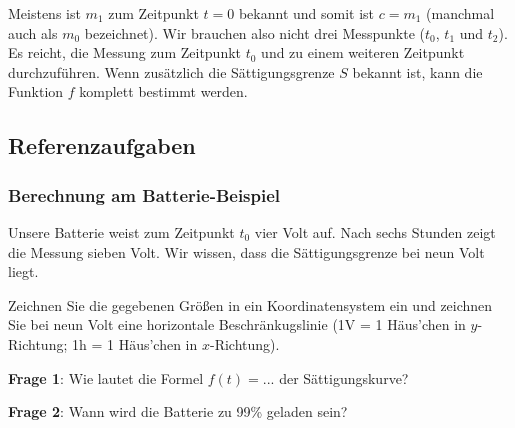 \begin{bemerkung}{}{}
Meistens ist $m_1$ zum Zeitpunkt $t=0$ bekannt und somit ist $c=m_1$ (manchmal auch als $m_0$ bezeichnet). Wir brauchen also nicht drei Messpunkte ($t_0$, $t_1$ und $t_2$). Es reicht, die Messung zum Zeitpunkt $t_0$ und zu einem weiteren Zeitpunkt durchzuführen. Wenn zusätzlich die Sättigungsgrenze $S$ bekannt ist, kann die Funktion $f$ komplett bestimmt werden.
\end{bemerkung}
\newpage

\subsection{Referenzaufgaben}

\subsubsection{Berechnung am Batterie-Beispiel}
Unsere Batterie weist  zum Zeitpunkt $t_0$ vier Volt auf. Nach sechs Stunden zeigt die Messung sieben Volt. Wir wissen, dass die Sättigungsgrenze bei neun Volt liegt.

Zeichnen Sie die gegebenen Größen in ein Koordinatensystem ein und zeichnen Sie bei neun Volt eine horizontale Beschränkugslinie (\zB 1V = 1 Häus'chen in $y$-Richtung; 1h = 1 Häus'chen in $x$-Richtung).



\textbf{Frage 1}: Wie lautet die Formel $f(t) = ...$ der Sättigungskurve?







\newpage

\textbf{Frage 2}: Wann wird die Batterie zu 99\% geladen sein?

\newpage

